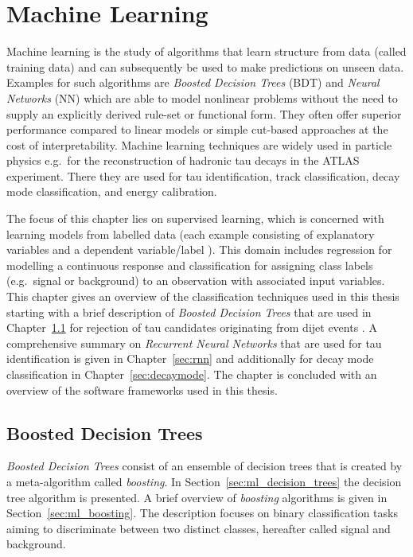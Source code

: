 \chapter{Machine Learning}
\label{sec:ml}


Machine learning is the study of algorithms that learn structure from data
(called training data) and can subsequently be used to make predictions on
unseen data. Examples for such algorithms are \emph{Boosted Decision Trees}
(BDT) and \emph{Neural Networks} (NN) which are able to model nonlinear problems
without the need to supply an explicitly derived rule-set or functional form.
They often offer superior performance compared to linear models or simple
cut-based approaches at the cost of interpretability. Machine learning
techniques are widely used in particle physics e.g.\ for the reconstruction of
hadronic tau decays in the ATLAS experiment. There they are used for tau
identification, track classification, decay mode classification, and energy
calibration.

The focus of this chapter lies on supervised learning, which is concerned with
learning models from labelled data (each example consisting of explanatory
variables and a dependent variable/label ).
This domain includes regression for modelling a continuous response and
classification for assigning class labels (e.g.\ signal or background) to an
observation with associated input variables. This chapter gives an overview of
the classification techniques used in this thesis starting with a brief
description of \emph{Boosted Decision Trees} that are used in
Chapter~\ref{sec:bdt} for rejection of tau candidates originating from dijet
events . A comprehensive summary on \emph{Recurrent Neural
  Networks} that are used for tau identification  is given in
Chapter~\ref{sec:rnn} and additionally for decay mode classification in
Chapter~\ref{sec:decaymode}. The chapter is concluded with an overview of the
software frameworks used in this thesis.

\section{Boosted Decision Trees}
\label{sec:bdt}

\emph{Boosted Decision Trees} consist of an ensemble of decision trees that is
created by a meta-algorithm called \emph{boosting}. In
Section~\ref{sec:ml_decision_trees} the decision tree algorithm is presented. A
brief overview of \emph{boosting} algorithms is given in
Section~\ref{sec:ml_boosting}. The description focuses on binary classification
tasks aiming to discriminate between two distinct classes, hereafter called
signal and background.

